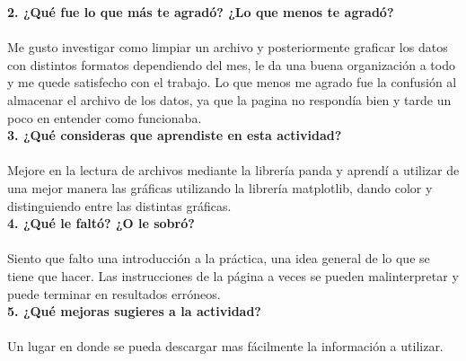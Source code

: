 \documentclass[12pt]{article}
\begin{document}
\noindent\textbf {2. ¿Qué fue lo que más te agradó? ¿Lo que menos te agradó?}\\ \\
Me gusto investigar como limpiar un archivo y posteriormente graficar los datos con distintos formatos dependiendo del mes, le da una buena organización a todo y me quede satisfecho con el trabajo. Lo que menos me agrado fue la confusión al almacenar el archivo de los datos, ya que la pagina no respondía bien y tarde un poco en entender como funcionaba. \\ 

\noindent\textbf {3. ¿Qué consideras que aprendiste en esta actividad? } \\ \\
Mejore en la lectura de archivos mediante la librería panda y aprendí a utilizar de una mejor manera las gráficas utilizando la librería matplotlib, dando color y distinguiendo entre las distintas gráficas. \\

\noindent\textbf {4. ¿Qué le faltó? ¿O le sobró?  } \\ \\
Siento que falto una introducción a la práctica, una idea general de lo que se tiene que hacer. Las instrucciones de la página a veces se pueden malinterpretar y puede terminar en resultados erróneos. \\

\noindent\textbf {5. ¿Qué mejoras sugieres a la actividad?}\\  \\
Un lugar en donde se pueda descargar mas fácilmente la información a utilizar.
\end{document}
